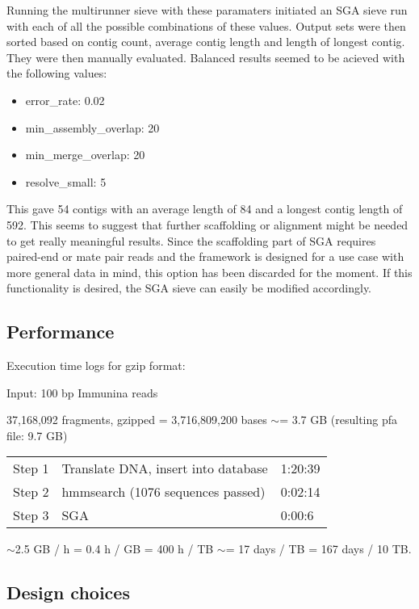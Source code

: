\documentclass[a4paper,12pt]{article}
\begin{document}
Running the multirunner sieve with these paramaters initiated an SGA sieve run with each of all the possible combinations of these values. Output sets were then sorted based on contig count, average contig length and length of longest contig. They were then manually evaluated. Balanced results seemed to be acieved with the following values:
\begin{itemize}
\item
error\_rate: 0.02
\item
min\_assembly\_overlap: 20
\item
min\_merge\_overlap: 20
\item
resolve\_small: 5
\end{itemize}
This gave 54 contigs with an average length of 84 and a longest contig length of 592. This seems to suggest that further scaffolding or alignment might be needed to get really meaningful results. Since the scaffolding part of SGA requires paired-end or mate pair reads and the framework is designed for a use case with more general data in mind, this option has been discarded for the moment. If this functionality is desired, the SGA sieve can easily be modified accordingly.

\subsection{Performance}
Execution time logs for gzip format:

Input: 100 bp Immunina reads

37,168,092 fragments, gzipped = 3,716,809,200 bases $\sim$= 3.7 GB (resulting pfa file: 9.7 GB)

\begin{tabular}{lll}
Step 1&Translate DNA, insert into database&1:20:39\\
Step 2&hmmsearch (1076 sequences passed)&0:02:14\\
Step 3&SGA&0:00:6
\end{tabular}


$\sim$2.5 GB / h = 0.4 h / GB = 400 h / TB $\sim$= 17 days / TB = 167 days / 10 TB.


 
\subsection{Design choices}
\end{document}
